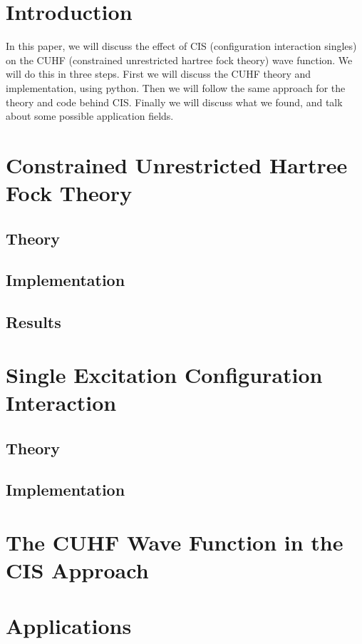\section{Introduction}
\label{sec:intro}
In this paper, we will discuss the effect of CIS (configuration interaction singles) on the CUHF (constrained unrestricted hartree fock theory) wave function. We will do this in three
steps. First we will discuss the CUHF theory and implementation, using python. Then we will follow the same approach for the theory and code behind CIS. Finally we will discuss what
we found, and talk about some possible application fields.


\section{Constrained Unrestricted Hartree Fock Theory}
\label{sec:cuhf}
\subsection{Theory}
\label{subsec:cuhf_theory}
\subsection{Implementation}
\label{subsec:cuhf_impl}
\subsection{Results}
\label{subsec:cuhf_res}

\section{Single Excitation Configuration Interaction}
\subsection{Theory}
\label{subsec:cis_theory}
\subsection{Implementation}
\label{subsec:cis_impl}

\section{The CUHF Wave Function in the CIS Approach}
\label{sec:combination}

\section{Applications}
\label{sec:applic}